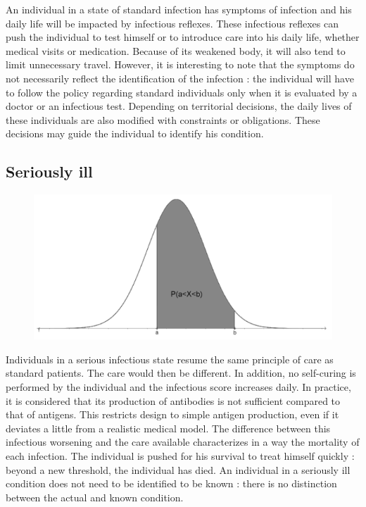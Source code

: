 An individual in a state of standard infection has symptoms of infection and his daily life will be impacted by infectious reflexes. These infectious reflexes can push the individual to test himself or to introduce care into his daily life, whether medical visits or medication. Because of its weakened body, it will also tend to limit unnecessary travel. However, it is interesting to note that the symptoms do not necessarily reflect the identification of the infection : the individual will have to follow the policy regarding standard individuals only when it is evaluated by a doctor or an infectious test. Depending on territorial decisions, the daily lives of these individuals are also modified with constraints or obligations. These decisions may guide the individual to identify his condition.\\

\subsection{Seriously ill}

\begin{figure}
  \centering
  \includegraphics[trim = 384 0 0 0, clip, width=\linewidth]{media/loi_gauss.png}
\end{figure}

Individuals in a serious infectious state resume the same principle of care as standard patients. The care would then be different. In addition, no self-curing is performed by the individual and the infectious score increases daily. In practice, it is considered that its production of antibodies is not sufficient compared to that of antigens. This restricts design to simple antigen production, even if it deviates a little from a realistic medical model. The difference between this infectious worsening and the care available characterizes in a way the mortality of each infection. The individual is pushed for his survival to treat himself quickly : beyond a new threshold, the individual has died. An individual in a seriously ill condition does not need to be identified to be known : there is no distinction between the actual and known condition.\\

